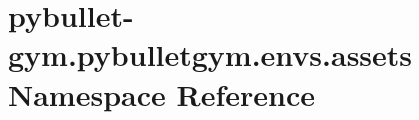 \hypertarget{namespacepybullet-gym_1_1pybulletgym_1_1envs_1_1assets}{}\section{pybullet-\/gym.pybulletgym.\+envs.\+assets Namespace Reference}
\label{namespacepybullet-gym_1_1pybulletgym_1_1envs_1_1assets}

